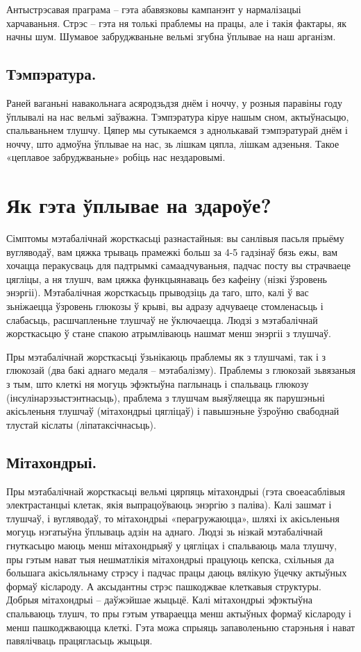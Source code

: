 Антыстрэсавая праграма – гэта абавязковы кампанэнт у нармалізацыі харчаваньня. Стрэс – гэта ня толькі праблемы на працы, але і такія фактары, як начны шум. Шумавое забруджваньне вельмі згубна ўплывае на наш арганізм.

\subsection{Тэмпэратура.}
Раней ваганьні навакольнага асяродзьдзя днём і ноччу, у розныя паравіны году ўплывалі на нас вельмі заўважна. Тэмпэратура кіруе нашым сном, актыўнасьцю, спальваньнем тлушчу. Цяпер мы сутыкаемся з аднолькавай тэмпэратурай днём і ноччу, што адмоўна ўплывае на нас, зь лішкам цяпла, лішкам адзеньня. Такое «цеплавое забруджваньне» робіць нас нездаровымі.

\section{Як гэта ўплывае на здароўе?}

Сімптомы мэтабалічнай жорсткасьці разнастайныя: вы санлівыя пасьля прыёму вугляводаў, вам цяжка трываць прамежкі больш за 4-5 гадзінаў бязь ежы, вам хочацца перакусваць для падтрымкі самаадчуваньня, падчас посту вы страчваеце цягліцы, а ня тлушч, вам цяжка функцыянаваць без кафеіну (нізкі ўзровень энэргіі). Мэтабалічная жорсткасьць прыводзіць да таго, што, калі ў вас зьніжаецца ўзровень глюкозы ў крыві, вы адразу адчуваеце стомленасьць і слабасьць, расшчапленьне тлушчаў не ўключаецца. Людзі з мэтабалічнай жорсткасьцю ў стане спакою атрымліваюць нашмат менш энэргіі з тлушчаў.

Пры мэтабалічнай жорсткасьці ўзьнікаюць праблемы як з тлушчамі, так і з глюкозай (два бакі аднаго медаля – мэтабалізму). Праблемы з глюкозай зьвязаныя з тым, што клеткі ня могуць эфэктыўна паглынаць і спальваць глюкозу (інсулінарэзыстэнтнасьць), праблема з тлушчам выяўляецца як парушэньні акісьленьня тлушчаў (мітахондрыі цягліцаў) і павышэньне ўзроўню свабоднай тлустай кіслаты (ліпатаксічнасьць).

\subsection{Мітахондрыі.}
Пры мэтабалічнай жорсткасьці вельмі цярпяць мітахондрыі (гэта своеасаблівыя электрастанцыі клетак, якія выпрацоўваюць энэргію з паліва). Калі зашмат і тлушчаў, і вугляводаў, то мітахондрыі «перагружаюцца», шляхі іх акісьленьня могуць нэгатыўна ўплываць адзін на аднаго. Людзі зь нізкай мэтабалічнай гнуткасьцю маюць менш мітахондрыяў у цягліцах і спальваюць мала тлушчу, пры гэтым нават тыя нешматлікія мітахондрыі працуюць кепска, схільныя да большага акісьляльнаму стрэсу і падчас працы даюць вялікую ўцечку актыўных формаў кіслароду. А аксыдантны стрэс пашкоджвае клеткавыя структуры. Добрыя мітахондрыі – даўжэйшае жыцьцё. Калі мітахондрыі эфэктыўна спальваюць тлушч, то пры гэтым утвараецца менш актыўных формаў кіслароду і менш пашкоджваюцца клеткі. Гэта можа спрыяць запаволеньню старэньня і нават павялічваць працягласьць жыцьця.

